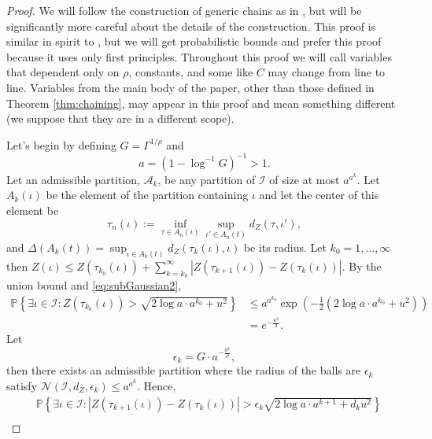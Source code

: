 \begin{proof}
We will follow the construction of generic chains as in \cite{talagrand2006generic}, but will be significantly more careful about the details of the construction.
This proof is similar in spirit to \cite{dumbgen2001multiscale}, but we will get probabilistic bounds and prefer this proof because it uses only first principles.
Throughout this proof we will call variables that dependent only on $\rho$, constants, and some like $C$ may change from line to line.
Variables from the main body of the paper, other than those defined in Theorem \ref{thm:chaining}, may appear in this proof and mean something different (we suppose that they are in a different scope).

Let's begin by defining $G = \Gamma^{1/\rho}$ and
\begin{equation*}
    a = (1 - \log^{-1} G)^{-1} > 1.
\end{equation*}
Let an admissible partition, $\mathcal A_k$, be any partition of $\mathcal I$ of size at most $a^{a^k}$.
Let $A_k(\iota)$ be the element of the partition containing $\iota$ and let the center of this element be 
\begin{equation*}
\tau_n(\iota) := \inf_{\tau \in A_n(\iota)} \sup_{\iota' \in A_n(t)} d_Z(\tau, \iota'),  
\end{equation*}
and $\Delta(A_k(t)) = \sup_{\iota \in A_k(t)} d_Z(\tau_k(\iota),\iota)$ be its radius.
Let $k_0 = 1,\ldots,\infty$ then $Z(\iota) \le Z(\tau_{k_0}(\iota)) + \sum_{k=k_0}^\infty |Z(\tau_{k+1}(\iota)) - Z(\tau_{k}(\iota))|$.
By the union bound and \eqref{eq:subGaussian2},
\begin{align*}
    \mathbb P \left\{\exists \iota \in \mathcal I : Z(\tau_{k_0}(\iota)) > \sqrt{2 \log a \cdot a^{k_0} + u^2} \right\} &\le a^{a^{k_0}} \exp \left(-\frac 12 \left(2 \log a \cdot a^{k_0} +  u^2 \right)\right) \\
    &= e^{-\frac{u^2}{2}}.
\end{align*}
Let 
\begin{equation}
\label{eq:epsilon}
    \epsilon_{k} = G \cdot a^{- \frac{a^k}{\rho}},
\end{equation} 
then there exists an admissible partition where the radius of the balls are $\epsilon_k$ satisfy $\mathcal N(\mathcal I, d_Z, \epsilon_k) \le a^{a^k}$.
Hence,
\begin{align*}
    &\mathbb P \left\{\exists \iota \in \mathcal I : |Z(\tau_{k + 1}(\iota)) - Z(\tau_k(\iota))| > \epsilon_k \sqrt{2 \log a \cdot a^{k+1} + d_k u^2} \right\} \\

\end{align*}
\end{proof}
